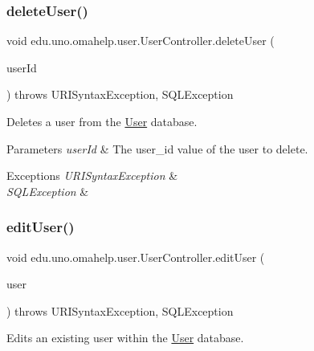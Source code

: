 \subsubsection{\texorpdfstring{delete\+User()}{deleteUser()}}
{\footnotesize\ttfamily void edu.\+uno.\+omahelp.\+user.\+User\+Controller.\+delete\+User (\begin{DoxyParamCaption}\item[{@Request\+Param int}]{user\+Id }\end{DoxyParamCaption}) throws U\+R\+I\+Syntax\+Exception, S\+Q\+L\+Exception}

Deletes a user from the \mbox{\hyperlink{classedu_1_1uno_1_1omahelp_1_1user_1_1_user}{User}} database.


\begin{DoxyParams}{Parameters}
{\em user\+Id} & The user\+\_\+id value of the user to delete. \\
\hline
\end{DoxyParams}

\begin{DoxyExceptions}{Exceptions}
{\em U\+R\+I\+Syntax\+Exception} & \\
\hline
{\em S\+Q\+L\+Exception} & \\
\hline
\end{DoxyExceptions}
\mbox{\label{classedu_1_1uno_1_1omahelp_1_1user_1_1_user_controller_a927db3a77547e5c129a02bcfc1bacddb}} 
\subsubsection{\texorpdfstring{edit\+User()}{editUser()}}
{\footnotesize\ttfamily void edu.\+uno.\+omahelp.\+user.\+User\+Controller.\+edit\+User (\begin{DoxyParamCaption}\item[{@Request\+Body \mbox{\hyperlink{classedu_1_1uno_1_1omahelp_1_1user_1_1_user}{User}}}]{user }\end{DoxyParamCaption}) throws U\+R\+I\+Syntax\+Exception, S\+Q\+L\+Exception}

Edits an existing user within the \mbox{\hyperlink{classedu_1_1uno_1_1omahelp_1_1user_1_1_user}{User}} database.


